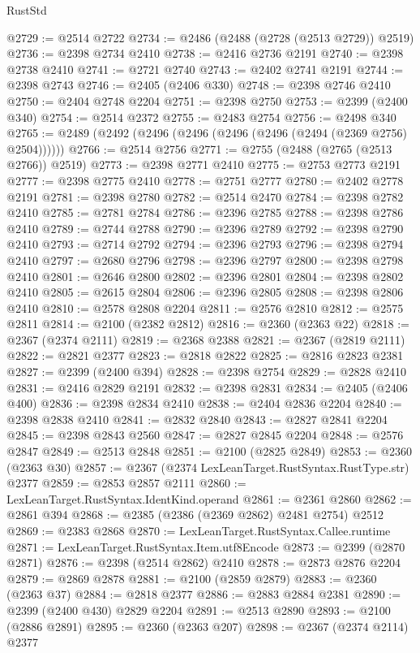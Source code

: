 \begin{lexlean}{RustStd}
\begin{coremodule}
@2729 := @2514 @2722
@2734 := @2486 (@2488 (@2728 (@2513 @2729)) @2519)
@2736 := @2398 @2734 @2410
@2738 := @2416 @2736 @2191
@2740 := @2398 @2738 @2410
@2741 := @2721 @2740
@2743 := @2402 @2741 @2191
@2744 := @2398 @2743
@2746 := @2405 (@2406 @330)
@2748 := @2398 @2746 @2410
@2750 := @2404 @2748 @2204
@2751 := @2398 @2750
@2753 := @2399 (@2400 @340)
@2754 := @2514 @2372
@2755 := @2483 @2754
@2756 := @2498 @340
@2765 := @2489 (@2492 (@2496 (@2496 (@2496 (@2496 (@2494 (@2369 @2756) @2504))))))
@2766 := @2514 @2756
@2771 := @2755 (@2488 (@2765 (@2513 @2766)) @2519)
@2773 := @2398 @2771 @2410
@2775 := @2753 @2773 @2191
@2777 := @2398 @2775 @2410
@2778 := @2751 @2777
@2780 := @2402 @2778 @2191
@2781 := @2398 @2780
@2782 := @2514 @2470
@2784 := @2398 @2782 @2410
@2785 := @2781 @2784
@2786 := @2396 @2785
@2788 := @2398 @2786 @2410
@2789 := @2744 @2788
@2790 := @2396 @2789
@2792 := @2398 @2790 @2410
@2793 := @2714 @2792
@2794 := @2396 @2793
@2796 := @2398 @2794 @2410
@2797 := @2680 @2796
@2798 := @2396 @2797
@2800 := @2398 @2798 @2410
@2801 := @2646 @2800
@2802 := @2396 @2801
@2804 := @2398 @2802 @2410
@2805 := @2615 @2804
@2806 := @2396 @2805
@2808 := @2398 @2806 @2410
@2810 := @2578 @2808 @2204
@2811 := @2576 @2810
@2812 := @2575 @2811
@2814 := @2100 (@2382 @2812)
@2816 := @2360 (@2363 @22)
@2818 := @2367 (@2374 @2111)
@2819 := @2368 @2388
@2821 := @2367 (@2819 @2111)
@2822 := @2821 @2377
@2823 := @2818 @2822
@2825 := @2816 @2823 @2381
@2827 := @2399 (@2400 @394)
@2828 := @2398 @2754
@2829 := @2828 @2410
@2831 := @2416 @2829 @2191
@2832 := @2398 @2831
@2834 := @2405 (@2406 @400)
@2836 := @2398 @2834 @2410
@2838 := @2404 @2836 @2204
@2840 := @2398 @2838 @2410
@2841 := @2832 @2840
@2843 := @2827 @2841 @2204
@2845 := @2398 @2843 @2560
@2847 := @2827 @2845 @2204
@2848 := @2576 @2847
@2849 := @2513 @2848
@2851 := @2100 (@2825 @2849)
@2853 := @2360 (@2363 @30)
@2857 := @2367 (@2374 LexLeanTarget.RustSyntax.RustType.str) @2377
@2859 := @2853 @2857 @2111
@2860 := LexLeanTarget.RustSyntax.IdentKind.operand
@2861 := @2361 @2860
@2862 := @2861 @394
@2868 := @2385 (@2386 (@2369 @2862) @2481 @2754) @2512
@2869 := @2383 @2868
@2870 := LexLeanTarget.RustSyntax.Callee.runtime
@2871 := LexLeanTarget.RustSyntax.Item.utf8Encode
@2873 := @2399 (@2870 @2871)
@2876 := @2398 (@2514 @2862) @2410
@2878 := @2873 @2876 @2204
@2879 := @2869 @2878
@2881 := @2100 (@2859 @2879)
@2883 := @2360 (@2363 @37)
@2884 := @2818 @2377
@2886 := @2883 @2884 @2381
@2890 := @2399 (@2400 @430) @2829 @2204
@2891 := @2513 @2890
@2893 := @2100 (@2886 @2891)
@2895 := @2360 (@2363 @207)
@2898 := @2367 (@2374 @2114) @2377

\end{coremodule}
\end{lexlean}
